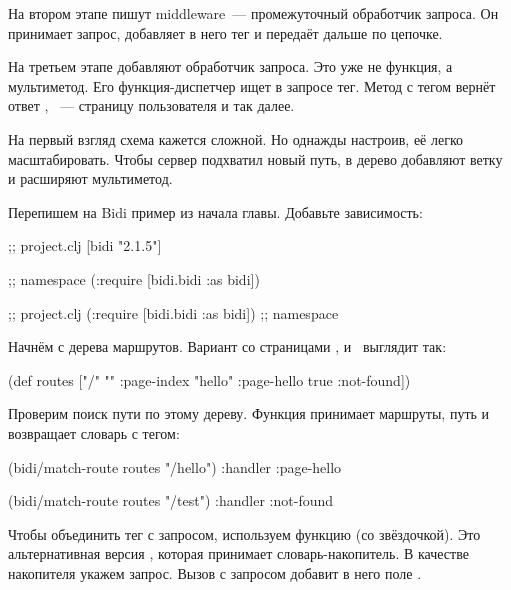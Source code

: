 
На втором этапе пишут middleware~--- промежуточный обработчик запроса. Он
принимает запрос, добавляет в него тег и передаёт дальше по цепочке.

На третьем этапе добавляют обработчик запроса. Это уже не функция, а
мультиметод. Его функция-диспетчер ищет в запросе тег. Метод с тегом
 вернёт ответ , ~--- страницу
пользователя и так далее.

На первый взгляд схема кажется сложной. Но однажды настроив, её легко
масштабировать. Чтобы сервер подхватил новый путь, в дерево добавляют ветку и
расширяют мультиметод.


Перепишем на Bidi пример из начала главы. Добавьте зависимость:

\ifnarrow

\begin{clojure}
;; project.clj
[bidi "2.1.5"]

;; namespace
(:require [bidi.bidi :as bidi])
\end{clojure}

\else

\begin{clojure}
[bidi "2.1.5"]                  ;; project.clj
(:require [bidi.bidi :as bidi]) ;; namespace
\end{clojure}

\fi

Начнём с дерева маршрутов. Вариант со страницами ,
 и~ выглядит так:

\begin{clojure}
(def routes
  ["/" {""      :page-index
        "hello" :page-hello
        true    :not-found}])
\end{clojure}


Проверим поиск пути по этому дереву. Функция  принимает
маршруты, путь и возвращает словарь с тегом:

\begin{clojure}
(bidi/match-route routes "/hello")
{:handler :page-hello}

(bidi/match-route routes "/test")
{:handler :not-found}
\end{clojure}


Чтобы объединить тег с запросом, используем функцию  (со
звёздочкой). Это альтернативная версия , которая принимает
словарь-накопитель. В качестве накопителя укажем запрос. Вызов
 с запросом добавит в него поле .

